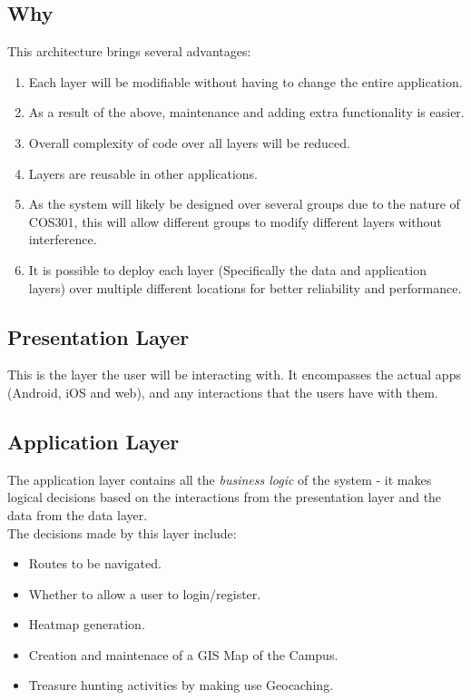 \documentclass[english]{article}
\begin{document}
	    \subsection{Why}
	    This architecture brings several advantages:
	    \begin{enumerate}
	        \item Each layer will be modifiable without having to change the entire application.
	        \item As a result of the above, maintenance and adding extra functionality is easier.
	        \item Overall complexity of code over all layers will be reduced.
	        \item Layers are reusable in other applications.
	        \item As the system will likely be designed over several groups due to the nature of COS301, this will allow different groups to modify different layers without interference.
	        \item It is possible to deploy each layer (Specifically the data and application layers) over multiple different locations for better reliability and performance.
	    \end{enumerate}
	    
	    \subsection{Presentation Layer}
	        This is the layer the user will be interacting with. It encompasses the actual apps (Android, iOS and web), and any interactions that the users have with them.
	        
	    \subsection{Application Layer}
	        The application layer contains all the \textit{business logic} of the system - it makes logical decisions based on the interactions from the presentation layer and the data from the data layer.  \\
	        The decisions made by this layer include:
	        \begin{itemize}
	            \item Routes to be navigated.
	            \item Whether to allow a user to login/register.
	            \item Heatmap generation.
	            \item Creation and maintenace of a GIS Map of the Campus.
	            \item Treasure hunting activities by making use Geocaching.
	        \end{itemize}
	        
\end{document}
